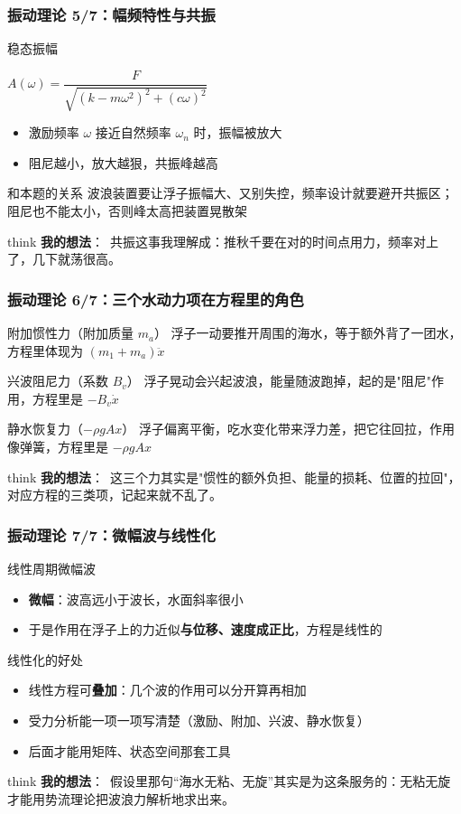 \documentclass[aspectratio=169]{beamer}
\newcommand{\remark}[2]{%
	\vspace{0.12cm}%
	\begin{beamercolorbox}[rounded=true,sep=6pt]{think}%
		{\color{orchidpurple}\textbf{#1}：}~#2%
	\end{beamercolorbox}%
}
\begin{document}
\begin{frame}
	\frametitle{振动理论 5/7：幅频特性与共振}
	\scriptsize
	\begin{block}{稳态振幅}
		\begin{center}
			$A(\omega)=\dfrac{F}{\sqrt{(k-m\omega^2)^2+(c\omega)^2}}$
		\end{center}
		\begin{itemize}
			\item 激励频率 $\omega$ 接近自然频率 $\omega_n$ 时，振幅被放大
			\item 阻尼越小，放大越狠，共振峰越高
		\end{itemize}
	\end{block}
	\begin{block}{和本题的关系}
		波浪装置要让浮子振幅大、又别失控，频率设计就要避开共振区；阻尼也不能太小，否则峰太高把装置晃散架
	\end{block}
	\remark{我的想法}{共振这事我理解成：推秋千要在对的时间点用力，频率对上了，几下就荡很高。}
\end{frame}

\begin{frame}
	\frametitle{振动理论 6/7：三个水动力项在方程里的角色}
	\scriptsize
	\begin{block}{附加惯性力（附加质量 $m_a$）}
		浮子一动要推开周围的海水，等于额外背了一团水，方程里体现为 $(m_1+m_a)\ddot x$
	\end{block}
	\begin{block}{兴波阻尼力（系数 $B_v$）}
		浮子晃动会兴起波浪，能量随波跑掉，起的是"阻尼"作用，方程里是 $-B_v\dot x$
	\end{block}
	\begin{block}{静水恢复力（$-\rho g A x$）}
		浮子偏离平衡，吃水变化带来浮力差，把它往回拉，作用像弹簧，方程里是 $-\rho g A x$
	\end{block}
	\remark{我的想法}{这三个力其实是"惯性的额外负担、能量的损耗、位置的拉回"，对应方程的三类项，记起来就不乱了。}
\end{frame}

\begin{frame}
	\frametitle{振动理论 7/7：微幅波与线性化}
	\scriptsize
	\begin{block}{线性周期微幅波}
		\begin{itemize}
			\item \textbf{微幅}：波高远小于波长，水面斜率很小
			\item 于是作用在浮子上的力近似\textbf{与位移、速度成正比}，方程是线性的
		\end{itemize}
	\end{block}
	\begin{block}{线性化的好处}
		\begin{itemize}
			\item 线性方程可\textbf{叠加}：几个波的作用可以分开算再相加
			\item 受力分析能一项一项写清楚（激励、附加、兴波、静水恢复）
			\item 后面才能用矩阵、状态空间那套工具
		\end{itemize}
	\end{block}
	\remark{我的想法}{假设里那句``海水无粘、无旋''其实是为这条服务的：无粘无旋才能用势流理论把波浪力解析地求出来。}
\end{frame}
\end{document}
